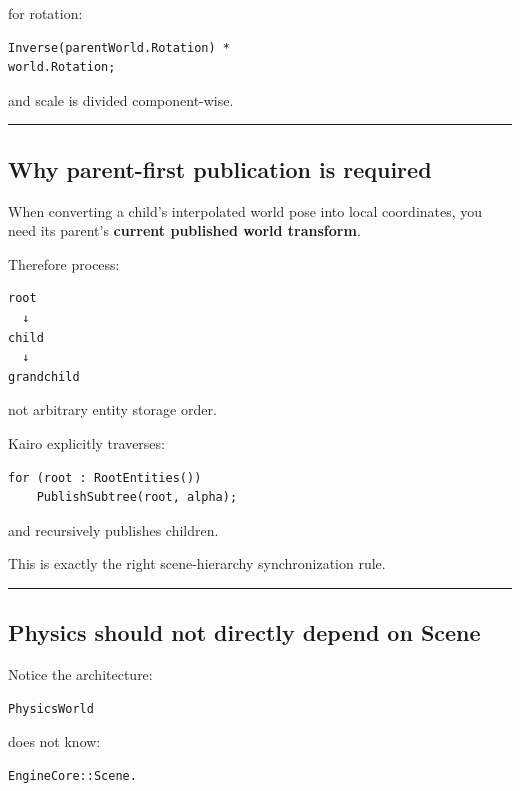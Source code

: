 for rotation:

\begin{verbatim}
Inverse(parentWorld.Rotation) *
world.Rotation;
\end{verbatim}

and scale is divided component-wise.

\begin{center}\rule{0.5\linewidth}{0.5pt}\end{center}

\subsection{Why parent-first publication is required}\label{06-engine-ii-ch037-why-parent-first-publication-is-required}

When converting a child's interpolated world pose into local coordinates, you need its parent's \textbf{current published world transform}.

Therefore process:

\begin{verbatim}
root
  ↓
child
  ↓
grandchild
\end{verbatim}

not arbitrary entity storage order.

Kairo explicitly traverses:

\begin{verbatim}
for (root : RootEntities())
    PublishSubtree(root, alpha);
\end{verbatim}

and recursively publishes children.

This is exactly the right scene-hierarchy synchronization rule.

\begin{center}\rule{0.5\linewidth}{0.5pt}\end{center}

\subsection{Physics should not directly depend on Scene}\label{06-engine-ii-ch037-physics-should-not-directly-depend-on-scene}

Notice the architecture:

\begin{verbatim}
PhysicsWorld
\end{verbatim}

does not know:

\begin{verbatim}
EngineCore::Scene.
\end{verbatim}

